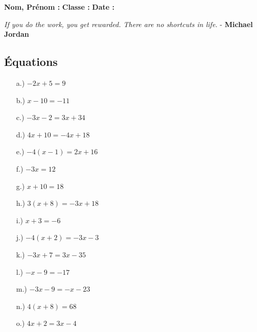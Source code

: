 \documentclass[11pt]{article}
\begin{document}

\newtheorem{Definition}{Définition}
\newtheorem{Theorem}{Théorème}
\newtheorem{Proposition}{Propriété}

\renewcommand{\labelitemi}{$\bullet$}
\renewcommand{\labelitemii}{$\circ$}

\setlength{\columnseprule}{1pt}

\textbf{Nom, Prénom :} \hspace{8cm} \textbf{Classe :} \hspace{3cm} \textbf{Date :}\\
\vspace{-0.8cm}
\begin{center}
  \textit{If you do the work, you get rewarded. There are no shortcuts in life.}  - \textbf{Michael Jordan}
\end{center}
\vspace{-0.8cm}

\subsection*{Équations}
\begin{multicols}{3}\noindent
  \begin{enumerate}
  \item[a.)] $-2x + 5 = 9$
  \item[b.)] $x - 10 = -11$
  \item[c.)] $-3x - 2 = 3x + 34$
  \item[d.)] $4x + 10 = -4x + 18$
  \item[e.)] $-4(x - 1) = 2x + 16$
  \item[f.)] $-3x = 12$
  \item[g.)] $x + 10 = 18$
  \item[h.)] $3(x + 8) = -3x + 18$
  \item[i.)] $x + 3 = -6$
  \item[j.)] $-4(x + 2) = -3x - 3$
  \item[k.)] $-3x + 7 = 3x - 35$
  \item[l.)] $-x - 9 = -17$
  \item[m.)] $-3x - 9 = -x - 23$
  \item[n.)] $4(x + 8) = 68$
  \item[o.)] $4x + 2 = 3x - 4$
  \end{enumerate}
\end{multicols}
\end{document}
